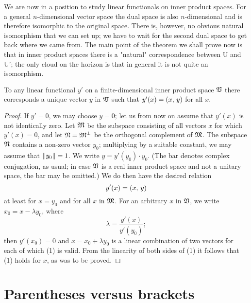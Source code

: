 We are now in a position to study linear functionals on inner product spaces. For a general \(n\)-dimensional vector space the dual space is also
\(n\)-dimensional and is therefore isomorphic to the original space. There is, however, no obvious natural isomorphism that we can set up; we have to wait for the second dual space to get back where we came from. The main point of the theorem we shall prove now is that in inner product spaces there is a "natural" correspondence between U and U'; the only cloud on the horizon is that in general it is not quite an isomorphism.
\begin{thmx}
    To any linear functional \(y'\) on a finite-dimensional inner product space \(\mathfrak{V}\) there corresponds a unique vector \(y\) in \(\mathfrak{V}\) such that \(y'(x) = \left(x,\,y\right)\) for all \(x\).
\end{thmx}
\begin{proof}
    If \(y' = 0\), we may choose \(y = 0\); let us from now on assume that
    \(y'(x)\) is not identically zero. Let \(\mathfrak{M}\) be the subspace consisting
    of all vectors \(x\) for which \(y'(x) = 0\), and let \(\frak{N} =
    \mathfrak{M}^{\perp}\) be the orthogonal complement of \(\mathfrak{M}\). The subspace
    \(\frak{N}\) contains a non-zero vector \(y_0\); multiplying by a suitable
    constant, we may assume that \(\left\lVert y_0\right\rVert = 1\). We write \(y =
    \overline{y'(y_0)} \cdot y_0\). (The bar denotes complex conjugation, as
    usual; in case \(\mathfrak{V}\) is a real inner product space and not a unitary
    space, the bar may be omitted.) We do then have the desired relation
    \begin{equation}
        y'(x) = \left(x,\,y\right)
    \end{equation}
    at least for \(x = y_0\) and for all \(x\) in \(\mathfrak{M}\). For an arbitrary
    \(x\) in \(\mathfrak{V}\), we write \(x_0 = x - \lambda y_0\), where
    \begin{equation*}
        \lambda = \frac{y'(x)}{y'(y_0)};
    \end{equation*}
    then \(y'(x_0) = 0\) and \(x = x_0 + \lambda y_0\) is a linear combination
    of two vectors for each of which (1) is valid. From the linearity of both
    sides of (1) it follows that (1) holds for \(x\), as was to be proved.
\end{proof}


\section{Parentheses versus brackets}

